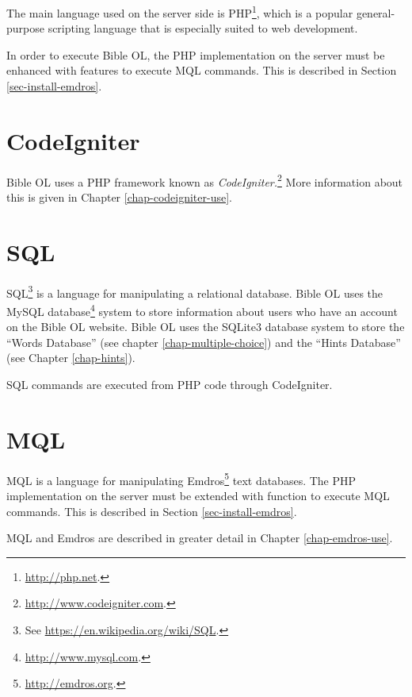 \documentclass[11pt,oneside,a4paper]{memoir}
\begin{document}
The main language used on the server side is PHP\footnote{\url{http://php.net}.}, which is a popular
general-purpose scripting language that is especially suited to web development.

In order to execute Bible OL, the PHP implementation on the server must be enhanced with features to
execute MQL commands. This is described in Section \ref{sec-install-emdros}.

\section{CodeIgniter}\label{sec-codeigniter}

Bible OL uses a PHP framework known as \emph{CodeIgniter.}\footnote{\url{http://www.codeigniter.com}.}
More information about this is given in Chapter \ref{chap-codeigniter-use}.


\section{SQL}

SQL\footnote{See \url{https://en.wikipedia.org/wiki/SQL}.} is a language for manipulating a
relational database. Bible OL uses the MySQL database\footnote{\url{http://www.mysql.com}.} system to store
information about users who have an account on the Bible OL website. Bible OL uses the SQLite3
database system to store the ``Words Database'' (see chapter \ref{chap-multiple-choice}) and the
``Hints Database'' (see Chapter \ref{chap-hints}).

SQL commands are executed from PHP code through CodeIgniter.


\section{MQL}\label{sec-mql}

MQL is a language for manipulating Emdros\footnote{\url{http://emdros.org}.} text
databases. The PHP implementation on the server must be extended with function to execute MQL
commands. This is described in Section \ref{sec-install-emdros}.

MQL and Emdros are described in greater detail in Chapter \ref{chap-emdros-use}.



\end{document}
